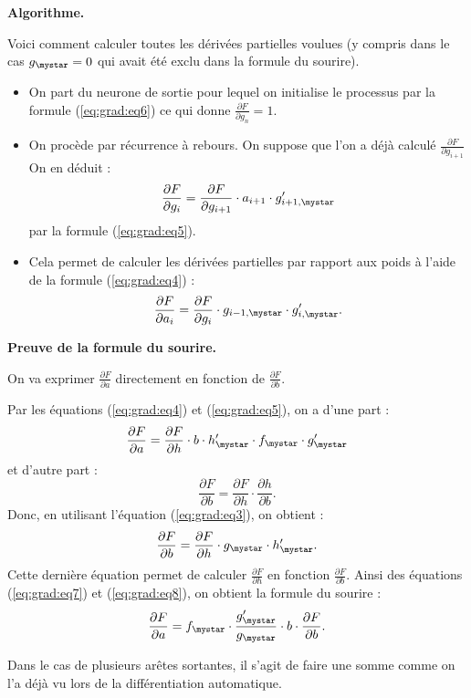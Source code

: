 \documentclass[11pt,class=report,crop=false]{standalone}
\begin{document}
\bigskip
\textbf{Algorithme.}


Voici comment calculer toutes les dérivées partielles voulues (y compris dans le cas $g_\mystar=0$ qui avait été exclu dans la formule du sourire).
\begin{itemize}
  \item On part du neurone de sortie pour lequel on initialise le processus par la formule
  (\ref{eq:grad:eq6}) ce qui donne 
  $\frac{\partial F}{\partial g_n} = 1$.
  \item On procède par récurrence à rebours. On suppose que l'on a déjà calculé
  $\frac{\partial F}{\partial g_{i+1}}$
  On en déduit :
  $$\frac{\partial F}{\partial g_{i}} =  \frac{\partial F}{\partial g_{i+1}} \cdot a_{i+1} \cdot  g'_{i+1,\mystar}$$
  par la formule (\ref{eq:grad:eq5}).
  \item Cela permet de calculer les dérivées partielles par rapport aux poids à l'aide de la formule (\ref{eq:grad:eq4}) :
  $$\frac{\partial F}{\partial a_i} = \frac{\partial F}{\partial g_i} \cdot g_{i-1,\mystar} \cdot  g'_{i,\mystar}.$$
\end{itemize}



\bigskip
\textbf{Preuve de la formule du sourire.}

On va exprimer $\frac{\partial F}{\partial a}$ directement en fonction de $\frac{\partial F}{\partial b}$.

Par les équations (\ref{eq:grad:eq4}) et (\ref{eq:grad:eq5}), on a d'une part :
\begin{equation}
\frac{\partial F}{\partial a} =   \frac{\partial F}{\partial h} \cdot b \cdot  h'_\mystar \cdot f_\mystar \cdot g'_\mystar
\label{eq:grad:eq7}
\end{equation}
et d'autre part :
$$\frac{\partial F}{\partial b} =  \frac{\partial F}{\partial h} \cdot \frac{\partial h}{\partial b}.$$
Donc, en utilisant l'équation (\ref{eq:grad:eq3}), on obtient :
\begin{equation}
\frac{\partial F}{\partial b} =   \frac{\partial F}{\partial h} \cdot g_\mystar \cdot  h'_\mystar.
\label{eq:grad:eq8}
\end{equation}
Cette dernière équation permet de calculer $\frac{\partial F}{\partial h}$ en fonction $\frac{\partial F}{\partial b}$. Ainsi des équations (\ref{eq:grad:eq7}) et (\ref{eq:grad:eq8}), on obtient la formule du sourire :
$$\frac{\partial F}{\partial a} = f_\mystar \cdot \frac{g'_\mystar}{g_\mystar} \cdot b \cdot \frac{\partial F}{\partial b}.$$

Dans le cas de plusieurs arêtes sortantes, il s'agit de faire une somme comme on l'a déjà vu lors de la différentiation automatique.
\end{document}
